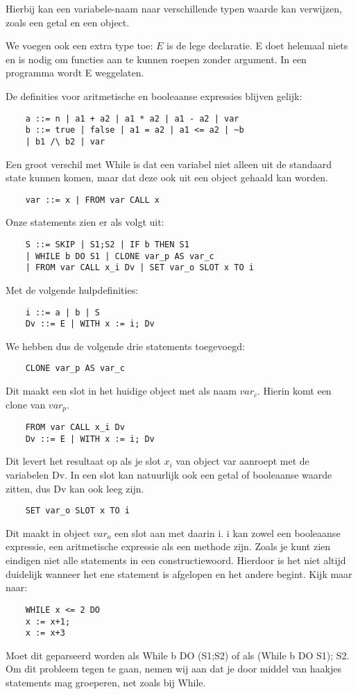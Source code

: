 \documentclass[12pt]{article}
\begin{document}
Hierbij kan een variabele-naam naar verschillende typen waarde kan verwijzen, zoals een getal en een object.

We voegen ook een extra type toe:
$E$ is de lege declaratie. E doet helemaal niets en is nodig om functies aan te kunnen roepen zonder argument.
In een programma wordt E weggelaten.


De definities voor aritmetische en booleaanse expressies blijven gelijk: 
\begin{lstlisting}
	a ::= n | a1 + a2 | a1 * a2 | a1 - a2 | var
	b ::= true | false | a1 = a2 | a1 <= a2 | ~b
	| b1 /\ b2 | var 
\end{lstlisting}

Een groot verschil met While is dat een variabel niet alleen uit de standaard state kunnen komen, maar dat deze ook uit een object gehaald kan worden. 
\begin{lstlisting}
	var ::= x | FROM var CALL x
\end{lstlisting}

Onze statements zien er als volgt uit: 
\begin{lstlisting}
	S ::= SKIP | S1;S2 | IF b THEN S1
	| WHILE b DO S1 | CLONE var_p AS var_c
	| FROM var CALL x_i Dv | SET var_o SLOT x TO i
\end{lstlisting}

Met de volgende hulpdefinities: 
\begin{lstlisting}
	i ::= a | b | S
	Dv ::= E | WITH x := i; Dv
\end{lstlisting}

We hebben dus de volgende drie statements toegevoegd: 
\begin{lstlisting}
	CLONE var_p AS var_c
\end{lstlisting} 
Dit maakt een slot in het huidige object met als naam $var_c$. Hierin komt een clone van $var_p$. 
\begin{lstlisting}
	FROM var CALL x_i Dv
	Dv ::= E | WITH x := i; Dv
\end{lstlisting}
Dit levert het resultaat op als je slot $x_i$ van object var aanroept met de variabelen Dv. In een slot kan natuurlijk ook een getal of booleaanse waarde zitten, dus Dv kan ook leeg zijn. 
\begin{lstlisting}
	SET var_o SLOT x TO i
\end{lstlisting} 
Dit maakt in object $var_o$ een slot aan met daarin i. i kan zowel een booleaanse expressie, een aritmetische expressie als een methode zijn. 
Zoals je kunt zien eindigen niet alle statements in een constructiewoord. Hierdoor is het niet altijd duidelijk wanneer het ene statement is afgelopen en het andere begint. Kijk maar naar:
\begin{lstlisting}
	WHILE x <= 2 DO
	x := x+1;
	x := x+3
\end{lstlisting}
Moet dit geparseerd worden als While b DO (S1;S2) of als (While b DO S1); S2. Om dit probleem tegen te gaan, nemen wij aan dat je door middel van haakjes statements mag groeperen, net zoals bij While.
\pagebreak
\end{document}
